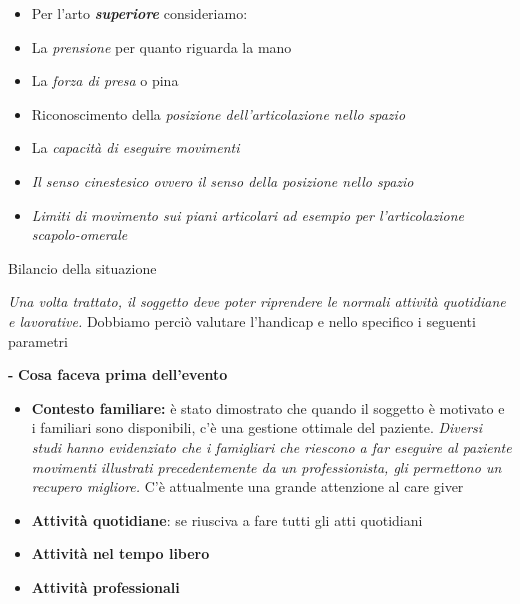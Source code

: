 \documentclass[]{article}
\begin{document}
\begin{itemize}
\item
  Per l'arto \textbf{\emph{superiore}} consideriamo:
\end{itemize}

\begin{itemize}
\item
  La \emph{prensione} per quanto riguarda la mano
\item
  La \emph{forza di presa} o pina
\item
  Riconoscimento della \emph{posizione dell'articolazione nello spazio}
\item
  La \emph{capacità di eseguire movimenti}
\item
  \emph{Il \emph{senso cinestesico} ovvero il senso della posizione
  nello spazio}
\item
  \emph{\emph{Limiti di movimento sui piani articolari ad esempio per
  l'articolazione scapolo-omerale}}
\end{itemize}

Bilancio della situazione

\emph{Una volta trattato, il soggetto deve poter riprendere le normali
attività quotidiane e lavorative.} Dobbiamo perciò valutare l'handicap e
nello specifico i seguenti parametri

\textbf{-} \textbf{Cosa faceva prima dell'evento}

\begin{itemize}
\item
  \textbf{Contesto familiare:} è stato dimostrato che quando il soggetto
  è motivato e i familiari sono disponibili, c'è una gestione ottimale
  del paziente. \emph{Diversi studi hanno evidenziato che i famigliari
  che riescono a far eseguire al paziente movimenti illustrati
  precedentemente da un professionista, gli permettono un recupero
  migliore.} C'è attualmente una grande attenzione al care giver
\end{itemize}

\begin{itemize}
\item
  \textbf{Attività quotidiane}: se riusciva a fare tutti gli atti
  quotidiani
\end{itemize}

\begin{itemize}
\item
  \textbf{Attività nel tempo libero}
\end{itemize}

\begin{itemize}
\item
  \textbf{Attività professionali}
\end{itemize}
\end{document}
